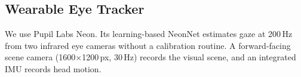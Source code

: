 \subsection{Wearable Eye Tracker}
\label{sec:method_eyetracker}

We use Pupil Labs Neon. Its learning-based NeonNet estimates gaze at
200\,Hz from two infrared eye cameras without a calibration routine. A forward-facing scene
camera (1600$\times$1200\,px, 30\,Hz) records the visual scene, and an
integrated IMU records head motion.
